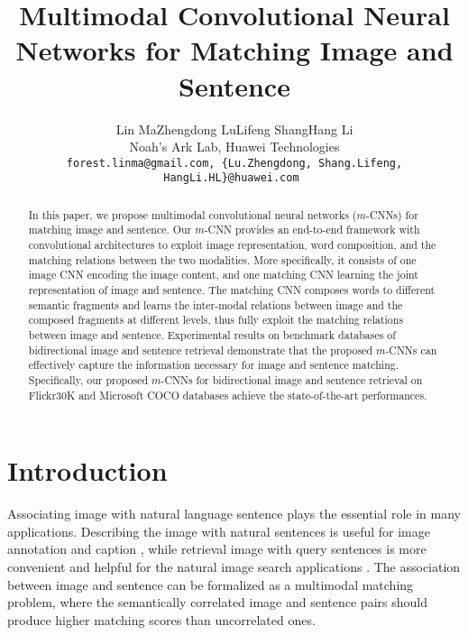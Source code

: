 \documentclass[10pt,twocolumn,letterpaper]{article}
\begin{document}
\title{Multimodal Convolutional Neural Networks for Matching Image and Sentence}

\author{Lin Ma\qquad Zhengdong Lu\qquad Lifeng Shang\qquad Hang Li\\
Noah's Ark Lab, Huawei Technologies\\
{\tt\footnotesize forest.linma@gmail.com, \{Lu.Zhengdong, Shang.Lifeng, HangLi.HL\}@huawei.com }
}

\maketitle


\begin{abstract}
  In this paper, we propose multimodal convolutional neural networks ($m$-CNNs) for matching image and sentence.  Our $m$-CNN provides an end-to-end framework with convolutional architectures to exploit image representation, word composition, and the matching relations between the two modalities. More specifically, it consists of one image CNN encoding the image content, and one matching CNN learning the joint representation of image and sentence. The matching CNN composes words to different semantic fragments  and learns the inter-modal relations between image and the composed fragments at different levels, thus fully exploit the matching relations between image and sentence. Experimental results on benchmark databases of bidirectional image and sentence retrieval demonstrate that the proposed $m$-CNNs can effectively capture the information necessary for image and sentence matching.  Specifically, our proposed $m$-CNNs for bidirectional image and sentence retrieval on Flickr30K and Microsoft COCO databases achieve the state-of-the-art performances.





\end{abstract}



\section{Introduction}
Associating image with natural language sentence plays the essential role in many applications. Describing the image with natural sentences is useful for image annotation and caption \cite{gong_eccv2014,kiros_nips2012,ordonez_nips2011}, while retrieval image with query sentences is more convenient and helpful for the natural image search applications \cite{hodosh_jair2013,karpathy_2014}. The association between image and sentence can be formalized as a multimodal matching problem, where the semantically correlated image and sentence pairs should produce higher matching scores than uncorrelated ones. 
\end{document}
